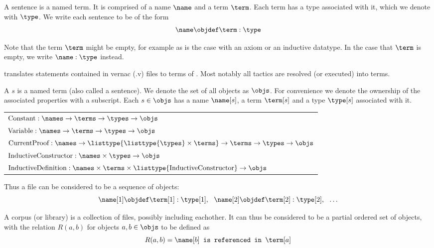 \begin{definition}[sentence]
	A sentence is a named term. It is comprised of a name $\name$ and a term $\term$. Each term has a type associated with it, which we denote with $\type$.
	We write each sentence to be of the form
	\[\name \objdef \term : \type\]
\end{definition}

Note that the term $\term$ might be empty, for example as is the case with an axiom or an inductive datatype.
In the case that $\term$ is empty, we write $\name : \type$ instead.

\coq translates \gallina statements contained in \coq vernac (.v) files to terms of \pcic.
Most notably all tactics are resolved (or executed) into terms.

\begin{definition}[{\coqobj[s]}]
	A \coqobj $s$ is a named \pcic term (also called a sentence).
	We denote the set of all \coq objects as $\objs$.
	For convenience we denote the ownership of the associated properties with a subscript.
	Each \coqobj $s \in \objs$ has a name $\name[s]$,
	a term $\term[s]$ and a type $\type[s]$ associated with it.

	\vspace{1em}
	\begin{tabular}{l}
		$\text{Constant} : \names \rightarrow \terms \rightarrow \types \rightarrow \objs$ \\
		$\text{Variable} : \names \rightarrow \terms \rightarrow \types \rightarrow \objs$ \\
		$\text{CurrentProof} : \names \rightarrow \listtype{\listtype{\types} \times \terms} \rightarrow \terms \rightarrow \types \rightarrow \objs$ \\
		$\text{InductiveConstructor} : \names \times \types \rightarrow \objs$ \\
		$\text{InductiveDefinition} : \names \times \terms \times \listtype{\text{InductiveConstructor}} \rightarrow \objs$
	\end{tabular}
\end{definition}

Thus a \coq file can be considered to be a sequence of \coq objects:
$$ \name[1] \objdef \term[1] : \type[1], ~~ \name[2] \objdef \term[2] : \type[2], ~~ \ldots $$

A \coq corpus (or library) is a collection of \coq files, possibly including eachother.
It can thus be considered to be a partial ordered set of \coq objects, with the relation $R(a,b)$ for \coq objects $a, b \in \objs$ to be defined as
\[R(a,b) = \name[b] \texttt{~is referenced in~} \term[a]\]

